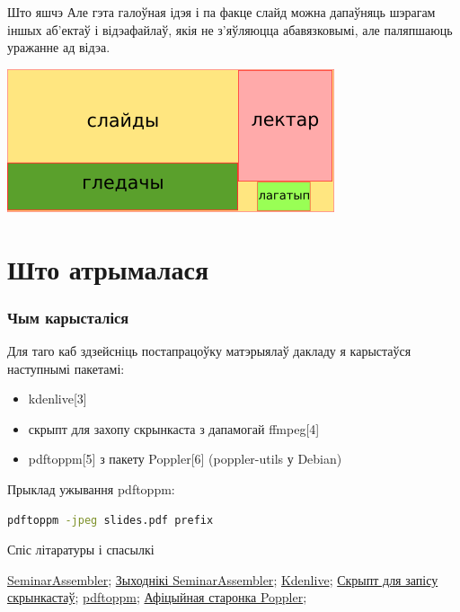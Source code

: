 \documentclass[ignorenonframetext,hyperref={pdftex,unicode}]{beamer}
\begin{document}
\begin{frame}{Што яшчэ} 
	Але гэта галоўная ідэя і па факце слайд можна дапаўняць шэрагам іншых аб'ектаў і відэафайлаў, якія не з'яўляюцца абавязковымі, але паляпшаюць уражанне ад відэа.
	\begin{center}
 		\includegraphics[height=0.5\textheight,keepaspectratio]{3}		
	\end{center}
\end{frame}

\section{Што атрымалася}

\begin{frame}[fragile]
	\frametitle{Чым карысталіся} 
	Для таго каб здзейсніць постапрацоўку матэрыялаў дакладу я карыстаўся наступнымі пакетамі:
	\begin{itemize}
		\item kdenlive[3]
		\item скрыпт для захопу скрынкаста з дапамогай ffmpeg[4]
		\item pdftoppm[5] з пакету Poppler[6] (poppler-utils у Debian)
	\end{itemize}
	
	Прыклад ужывання pdftoppm:
		\begin{lstlisting}[language=bash]
pdftoppm -jpeg slides.pdf prefix
		\end{lstlisting}
\end{frame}

\frame{\questionslide}

\begin{frame}{Спіс літаратуры і спасылкі}
	\begin{thebibliography}{10}
	\beamertemplatetextbibitems
	\bibitem{}
		{\sc \href{http://wiki.4intra.net/SeminarAssembler}{SeminarAssembler}};
	\bibitem{}
		{\sc \href{https://abf.io/belonesox/seminar-assembler/}{Зыходнікі SeminarAssembler}};
	\bibitem{}
		{\sc \href{https://kdenlive.org/}{Kdenlive}};
	\bibitem{}
		{\sc \href{https://github.com/measles/mlug\_screencast\_sound}{Скрыпт для запісу скрынкастаў}};
	\bibitem{}
		{\sc \href{http://linux.die.net/man/1/pdftoppm}{pdftoppm}};
	\bibitem{}
		{\sc \href{https://poppler.freedesktop.org/}{Афіцыйная старонка Poppler}};
	\end{thebibliography}
\end{frame}
\end{document}
